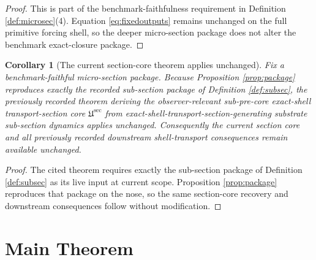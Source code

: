 \documentclass[11pt]{article}
\newcommand{\SubPreSectionCore}{\mathfrak U^{\mathrm{sec}}}
\newtheorem{corollary}{Corollary}
\begin{document}
\begin{proof}
This is part of the benchmark-faithfulness requirement in Definition \ref{def:microsec}(4). Equation \eqref{eq:fixedoutputs} remains unchanged on the full primitive forcing shell, so the deeper micro-section package does not alter the benchmark exact-closure package.
\end{proof}

\begin{corollary}[The current section-core theorem applies unchanged]
\label{cor:section}
Fix a benchmark-faithful micro-section package. Because Proposition \ref{prop:package} reproduces exactly the recorded sub-section package of Definition \ref{def:subsec}, the previously recorded theorem deriving the observer-relevant sub-pre-core exact-shell transport-section core \(\SubPreSectionCore\) from exact-shell-transport-section-generating substrate sub-section dynamics applies unchanged. Consequently the current section core and all previously recorded downstream shell-transport consequences remain available unchanged.
\end{corollary}

\begin{proof}
The cited theorem requires exactly the sub-section package of Definition \ref{def:subsec} as its live input at current scope. Proposition \ref{prop:package} reproduces that package on the nose, so the same section-core recovery and downstream consequences follow without modification.
\end{proof}

\section{Main Theorem}
\end{document}
